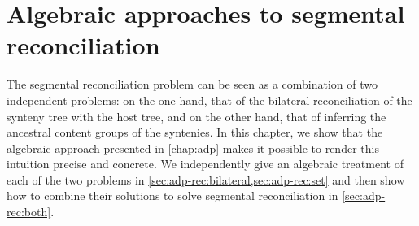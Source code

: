\chapter{Algebraic approaches to segmental reconciliation}\label{chap:adp-rec}

\newcommand{\algsignrec}{\algsign_{\mathrm{rec}}}
\newcommand{\gramrec}{\gram_{\mathrm{rec}}}
\newcommand{\gRec}{\mathrm{Rec}}
\newcommand{\gRecPath}{\mathrm{Rec}^{\downarrow}}
\newcommand{\gRecIn}{\mathrm{Rec}^{\ast}}
\newcommand{\gRecOut}{\mathrm{Rec}^{\curvearrowright}}
\newcommand{\xmin}{x_{\mathrm{min}}}
\newcommand{\xin}{x_{\mathrm{in}}}
\newcommand{\xout}{x_{\mathrm{out}}}
\newcommand{\xlca}{x_{\mathrm{lca}}}
\newcommand{\algsignset}{\algsign_{\mathrm{set}}}
\newcommand{\evSplit}{\mathrm{split}}
\newcommand{\gramset}{\gram_{\mathrm{set}}}
\newcommand{\gCont}{\mathrm{C}}
\newcommand{\gContSub}{\mathrm{\Delta}}
\newcommand{\gSplit}{\mathrm{Split}}
\newcommand{\gBranch}{\mathrm{Branch}}
\newcommand{\gramseq}{\gram_{\mathrm{seq}}}
\newcommand{\gRecSplit}{\mathrm{RecSplit}}
\newcommand{\gRecPathBranch}{\mathrm{RecBranch}^{\downarrow}}
\newcommand{\gRecInBranch}{\mathrm{RecBranch}^{\ast}}
\newcommand{\gRecOutBranch}{\mathrm{RecBranch}^{\curvearrowright}}
\newcommand{\gRecBranchEnd}{\mathrm{RecBranch}'}


The segmental reconciliation problem can be seen as a combination of two independent problems: on the one hand, that of the bilateral reconciliation of the synteny tree with the host tree, and on the other hand, that of inferring the ancestral content groups of the syntenies.
In this chapter, we show that the algebraic approach presented in \cref{chap:adp} makes it possible to render this intuition precise and concrete.
We independently give an algebraic treatment of each of the two problems in \cref{sec:adp-rec:bilateral,sec:adp-rec:set} and then show how to combine their solutions to solve segmental reconciliation in \cref{sec:adp-rec:both}.

